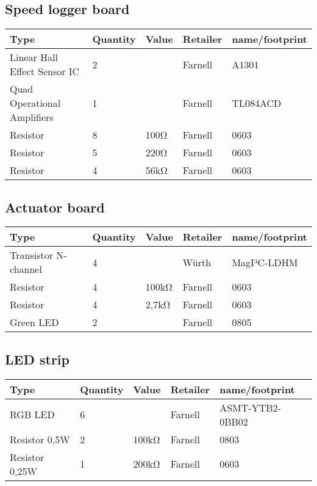 \subsection{Speed logger board}
\begin{center}
\begin{tabularx}{\textwidth}{|X|l|l|l|l|}
    \hline
   \textbf{Type} & \textbf{Quantity} & \textbf{Value} & \textbf{Retailer} & \textbf{name/footprint} \\ \hline
    Linear Hall Effect Sensor IC & 2 &  & Farnell & A1301 \\ \hline
    Quad Operational Amplifiers  & 1 &  & Farnell & TL084ACD \\ \hline
    Resistor  & 8 & 100Ω & Farnell & 0603 \\ \hline
    Resistor  & 5 & 220Ω & Farnell & 0603 \\ \hline
    Resistor  & 4 & 56kΩ & Farnell & 0603 \\ \hline
    	\end{tabularx}
\end{center}

\subsection{Actuator board}
\begin{center}
\begin{tabularx}{\textwidth}{|X|l|l|l|l|}
    \hline
   \textbf{Type} & \textbf{Quantity} & \textbf{Value} & \textbf{Retailer} & \textbf{name/footprint} \\ \hline
    Transistor N-channel & 4 &  & Würth & MagI³C-LDHM \\ \hline
    Resistor  & 4 & 100kΩ & Farnell & 0603 \\ \hline
    Resistor  & 4 & 2,7kΩ & Farnell & 0603 \\ \hline
    Green LED & 2 &  & Farnell & 0805 \\ \hline
	\end{tabularx}
\end{center}

\subsection{LED strip}
\begin{center}
\begin{tabularx}{\textwidth}{|X|l|l|l|l|}
    \hline
   \textbf{Type} & \textbf{Quantity} & \textbf{Value} & \textbf{Retailer} & \textbf{name/footprint} \\ \hline
    RGB LED & 6 &  & Farnell & ASMT-YTB2-0BB02 \\ \hline
    Resistor 0,5W  & 2 & 100kΩ & Farnell & 0803 \\ \hline
    Resistor 0,25W & 1 & 200kΩ & Farnell & 0603 \\ \hline
	\end{tabularx}
\end{center}

